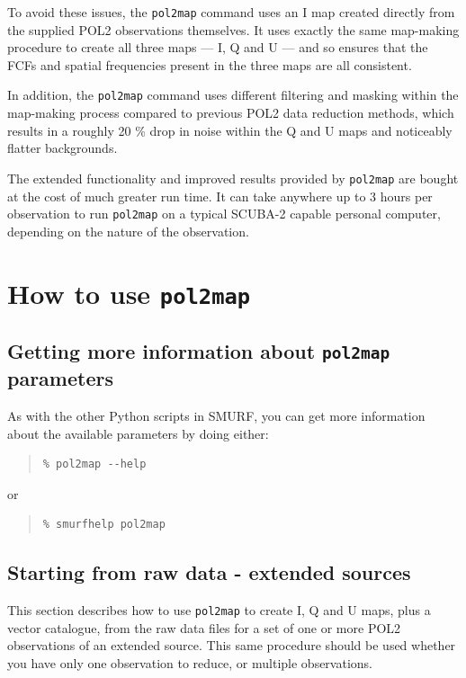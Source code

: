 \documentclass[twoside,11pt]{starlink}
\begin{document}
To avoid these issues, the \texttt{pol2map} command uses an I map created
directly from the supplied POL2 observations themselves. It uses exactly
the same map-making procedure to create all three maps --- I, Q and U --- and
so ensures that the FCFs and spatial frequencies present in the three maps are
all consistent.

In addition, the \texttt{pol2map} command uses different filtering and
masking within the map-making process compared to previous POL2 data reduction
methods, which results in a roughly 20 \% drop in noise within the Q and U
maps and noticeably flatter backgrounds.

The extended functionality and improved results provided by
\texttt{pol2map} are bought at the cost of much greater run time. It can
take anywhere up to 3 hours per observation to run \texttt{pol2map} on a
typical SCUBA-2 capable personal computer, depending on the nature of the
observation.

\section{How to use \texttt{pol2map}}

\subsection{Getting more information about \texttt{pol2map} parameters}
As with the other Python scripts in SMURF, you can get more information
about the available parameters by doing either:

\begin{quote}
\begin{verbatim}
% pol2map --help
\end{verbatim}
\end{quote}

or

\begin{quote}
\begin{verbatim}
% smurfhelp pol2map
\end{verbatim}
\end{quote}



\subsection{Starting from raw data - extended sources\label{se1}}
This section describes how to use \texttt{pol2map} to create I, Q and U
maps, plus a vector catalogue, from the raw data files for a set of one
or more POL2 observations of an extended source. This same procedure
should be used whether you have only one observation to reduce, or
multiple observations.
\end{document}
